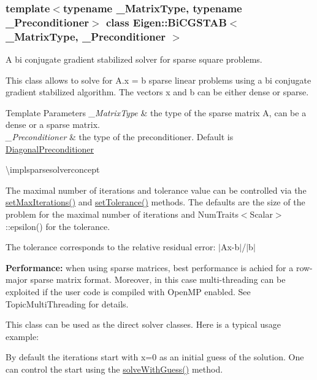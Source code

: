 \subsubsection*{template$<$typename \+\_\+\+Matrix\+Type, typename \+\_\+\+Preconditioner$>$\newline
class Eigen\+::\+Bi\+C\+G\+S\+T\+A\+B$<$ \+\_\+\+Matrix\+Type, \+\_\+\+Preconditioner $>$}

A bi conjugate gradient stabilized solver for sparse square problems. 

This class allows to solve for A.\+x = b sparse linear problems using a bi conjugate gradient stabilized algorithm. The vectors x and b can be either dense or sparse.


\begin{DoxyTemplParams}{Template Parameters}
{\em \+\_\+\+Matrix\+Type} & the type of the sparse matrix A, can be a dense or a sparse matrix. \\
\hline
{\em \+\_\+\+Preconditioner} & the type of the preconditioner. Default is \mbox{\hyperlink{class_eigen_1_1_diagonal_preconditioner}{Diagonal\+Preconditioner}}\\
\hline
\end{DoxyTemplParams}
\textbackslash{}implsparsesolverconcept

The maximal number of iterations and tolerance value can be controlled via the \mbox{\hyperlink{class_eigen_1_1_iterative_solver_base_af83de7a7d31d9d4bd1fef6222b07335b}{set\+Max\+Iterations()}} and \mbox{\hyperlink{class_eigen_1_1_iterative_solver_base_ac160a444af8998f93da9aa30e858470d}{set\+Tolerance()}} methods. The defaults are the size of the problem for the maximal number of iterations and Num\+Traits$<$\+Scalar$>$\+::epsilon() for the tolerance.

The tolerance corresponds to the relative residual error\+: $\vert$\+Ax-\/b$\vert$/$\vert$b$\vert$

{\bfseries{Performance\+:}} when using sparse matrices, best performance is achied for a row-\/major sparse matrix format. Moreover, in this case multi-\/threading can be exploited if the user code is compiled with Open\+MP enabled. See Topic\+Multi\+Threading for details.

This class can be used as the direct solver classes. Here is a typical usage example\+: 
\begin{DoxyCodeInclude}{0}
\end{DoxyCodeInclude}


By default the iterations start with x=0 as an initial guess of the solution. One can control the start using the \mbox{\hyperlink{class_eigen_1_1_iterative_solver_base_adcc18d1ab283786dcbb5a3f63f4b4bd8}{solve\+With\+Guess()}} method.

